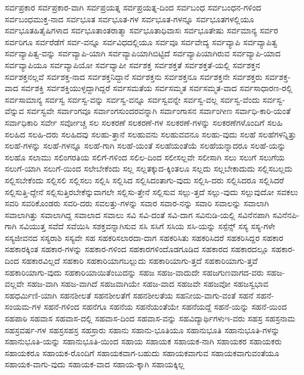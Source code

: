 {ಸರ್ವಪ್ರಕಾರ
ಸರ್ವಪ್ರಕಾರ-ವಾಗಿ
ಸರ್ವಪ್ರಯತ್ನ
ಸರ್ವಪ್ರಯತ್ನ-ದಿಂದ
ಸರ್ವಬಂಧ
ಸರ್ವಬಂಧನ-ಗಳಿಂದ
ಸರ್ವಬಂಧಮುಕ್ತ-ನಾದ
ಸರ್ವಭೂತ
ಸರ್ವಭೂತ-ಗಳ
ಸರ್ವಭೂತ-ಗಳನ್ನೂ
ಸರ್ವಭೂತಗಳಲ್ಲಿಯೂ
ಸರ್ವಭೂತಹಿತೈಷಿಗಳಾದ
ಸರ್ವಭೂತಾಂತರಾತ್ಮಾ
ಸರ್ವಭೂತಾಧಿವಾಸಃ
ಸರ್ವಭೂತೇಷು
ಸರ್ವಮಾನ್ಯ
ಸರ್ವರ
ಸರ್ವರಿಗೂ
ಸರ್ವರೆಡೆಗೆ
ಸರ್ವ-ವನ್ನೂ
ಸರ್ವವಿಧದಲ್ಲಿಯೂ
ಸರ್ವವೂ
ಸರ್ವವೇದ್ಯ
ಸರ್ವವ್ಯಾಪಿ
ಸರ್ವವ್ಯಾಪಿತ್ವ
ಸರ್ವವ್ಯಾಪಿತ್ವ-ವನ್ನು
ಸರ್ವವ್ಯಾಪಿ-ಯಾಗಿ
ಸರ್ವವ್ಯಾಪಿಯಾಗಿಬಿಟ್ಟಿದೆ
ಸರ್ವವ್ಯಾಪಿಯಾಗಿರುವ
ಸರ್ವವ್ಯಾಪಿ-ಯಾದ
ಸರ್ವವ್ಯಾಪಿಯೂ
ಸರ್ವವ್ಯಾಪಿಯೋ
ಸರ್ವವ್ಯಾಪೀ
ಸರ್ವಶಕ್ತ
ಸರ್ವಶಕ್ತತೆ
ಸರ್ವಶಕ್ತತೆ-ಯಲ್ಲಿ
ಸರ್ವಶಕ್ತನ
ಸರ್ವಶಕ್ತನಲ್ಲವೆ
ಸರ್ವಶಕ್ತ-ನಾದ
ಸರ್ವಶಕ್ತನಿದ್ದಾನೆ
ಸರ್ವಶಕ್ತನು
ಸರ್ವಶಕ್ತನೂ
ಸರ್ವಶಕ್ತನೇ
ಸರ್ವಶಕ್ತರು
ಸರ್ವಶಕ್ತ-ವಾದ
ಸರ್ವಶಕ್ತಿ
ಸರ್ವಶಕ್ತಿಯುಳ್ಳದ್ದಾಗಿದ್ದರೆ
ಸರ್ವಸಮತೆಯ
ಸರ್ವಸಮ್ಮತ
ಸರ್ವಸಮ್ಮತ-ವಾದ
ಸರ್ವಸಾಧಾರಣ-ರಲ್ಲಿ
ಸರ್ವಸಾಮಾನ್ಯ
ಸರ್ವಸ್ವ
ಸರ್ವಸ್ವ-ವನ್ನು
ಸರ್ವಸ್ವ-ವನ್ನೂ
ಸರ್ವಸ್ವವನ್ನೇ
ಸರ್ವಸ್ವ-ವಲ್ಲ
ಸರ್ವಸ್ವ-ವೆಂದು
ಸರ್ವಸ್ವ-ವೆನ್ನುವ
ಸರ್ವಸ್ವವೇ
ಸರ್ವಾಂಗವೂ
ಸರ್ವಾಂಗಸುಂದರವನ್ನಾಗಿ
ಸರ್ವಾಂಗಾಸನ
ಸರ್ವಾಂಗೀಣ
ಸರ್ವಾಧಿ-ಕಾರಿ-ಯಂತೆ
ಸರ್ವಾಧಿಕಾರಿ
ಸರ್ವೇ
ಸರ್ವೋಚ್ಚ
ಸಲ
ಸಲಕರಣೆ
ಸಲಕರಣೆ-ಗಳ
ಸಲಕರಣೆ-ಗಳನ್ನು
ಸಲಕರಣೆಗಳೊಂದಿಗೆ
ಸಲಹಿ
ಸಲಹಿದ
ಸಲಹಿ-ದರು
ಸಲಹಿದವು
ಸಲಹು-ತ್ತಾನೆ
ಸಲಹುವನು
ಸಲಹುವವನೂ
ಸಲಹು-ವುದು
ಸಲಹೆ
ಸಲಹೆಗಳನ್ನಿತ್ತು
ಸಲಹೆ-ಗಳನ್ನು
ಸಲಹೆ-ಗಳನ್ನೂ
ಸಲಹೆ-ಗಾಗಿ
ಸಲಹೆ-ಯಂತೆ
ಸಲಹೆಯಂತೆಯೆ
ಸಲಹೆಯನ್ನಾದರೂ
ಸಲಹೆ-ಯನ್ನು
ಸಲಹೊ
ಸಲಾಮು
ಸಲಿಂಗರತಿಯ
ಸಲಿಗೆ-ಗಳಿಂದ
ಸಲಿಲ-ದಿಂದ
ಸಲೀಸಲ್ಲವೇ
ಸಲೀಸಾಗಿ
ಸಲು
ಸಲುಗೆ
ಸಲುಗೆಯ
ಸಲುಗೆ-ಯಾಗಿ
ಸಲುಗೆ-ಯಿಂದ
ಸಲೇಬೇಕೆಂದು
ಸಲ್ಲ
ಸಲ್ಲತಕ್ಕುದ-ಕ್ಕಿಂತಲೂ
ಸಲ್ಲದು
ಸಲ್ಲಬೇಕಾದುದು
ಸಲ್ಲಿಸಬಲ್ಲದು
ಸಲ್ಲಿಸಬೇಕೆಂದು
ಸಲ್ಲಿಸಲಿ
ಸಲ್ಲಿಸಲು
ಸಲ್ಲಿಸಿ
ಸಲ್ಲಿಸಿದ
ಸಲ್ಲಿಸಿದಂತಾಗು-ವುದು
ಸಲ್ಲಿಸಿ-ದರು
ಸಲ್ಲಿಸಿದರೂ
ಸಲ್ಲಿಸಿದರೆ
ಸಲ್ಲಿಸುತ್ತಿ-ದ್ದೇನೆ
ಸಲ್ಲಿಸುತ್ತಿರಬೇಕೆನ್ನುವಾಗಲೇ
ಸಲ್ಲಿಸು-ತ್ತೇನೆ
ಸಲ್ಲಿಸುವ
ಸಲ್ಲು-ತ್ತದೆ
ಸಲ್ಲು-ವುದು
ಸಲ್ಲುವುದೋ
ಸವಕಲು
ಸವರಿ
ಸವರಿಕೊಂಡರು
ಸವರಿ-ದರು
ಸವಲತ್ತು-ಗಳನ್ನು
ಸವಾರ
ಸವಾರ-ನನ್ನು
ಸವಾರಿ
ಸವಾಲನ್ನು
ಸವಾಲಾಗಿ
ಸವಾಲಾಗಿತ್ತು
ಸವಾಲಾಗಿದ್ದ
ಸವಾಲಾದ
ಸವಾಲು
ಸವಿ
ಸವಿ-ದಂತೆ
ಸವಿ-ದಾಗ
ಸವಿನುಡಿ-ಯಲ್ಲಿ
ಸವಿನೆನಪಾಗಿ
ಸವಿನೆನಪಿ-ಗಾಗಿ
ಸವಿಯುತ್ತ
ಸವೆದೆ
ಸವೆಯಿಸಿ
ಸಶಕ್ತವನ್ನಾಗಿಸುವ
ಸಸಿ
ಸಸಿಗೆ
ಸಸಿಯ
ಸಸಿ-ಯನ್ನು
ಸಸ್ಪೆನ್ಸ್
ಸಸ್ಯ
ಸಸ್ಯ-ಗಳೇ
ಸಸ್ಯಜೀವನದ
ಸಸ್ಯರಾಶಿ
ಸಸ್ಯವೇ
ಸಹ
ಸಹಕರಿಸಲಾರದಾ-ದಾಗ
ಸಹಕರಿಸಿತು
ಸಹಕರಿಸಿದರೆ
ಸಹಕರಿಸಿದ್ದರ
ಸಹಕಾರ
ಸಹಕಾರಕ್ಕಿಂತ
ಸಹಕಾರ-ಗಳನ್ನು
ಸಹಕಾರ-ಗಳಿಂದ
ಸಹಕಾರಗಳಿಂದೊಡಗೂಡಿದ
ಸಹಕಾರದ
ಸಹಕಾರದಲ್ಲೂ
ಸಹಕಾರ-ದಿಂದ
ಸಹಕಾರವಿಲ್ಲದೆ
ಸಹಕಾರಿ
ಸಹಕಾರಿಯಾಗಬಲ್ಲುದು
ಸಹಕಾರಿಯಾಗು-ತ್ತದೆ
ಸಹಕಾರಿಯಾಗು-ತ್ತವೆ
ಸಹಕಾರಿಯಾಗು-ವುದು
ಸಹಕಾರಿಯಾಯಿತೆಂಬುದನ್ನು
ಸಹಜ
ಸಹಜ-ವಾದುದೇ
ಸಹಜಗುಣವಾಗದ-ವರು
ಸಹಜ-ವಲ್ಲವೇ
ಸಹಜ-ವಾಗಿ
ಸಹಜ-ವಾಗಿದೆ
ಸಹಜವಾಗಿಯೇ
ಸಹಜ-ವಾದ
ಸಹಜವೇ
ಸಹಜವೋ
ಸಹಜಸ್ವಭಾವ
ಸಹಧರ್ಮಿಣಿ-ಯಾಗಿ
ಸಹನಶೀಲತೆ
ಸಹನಶೀಲತೆಗೆ
ಸಹನಶೀಲತೆಯ
ಸಹನೀಯ-ವಾಗು-ವಂತೆ
ಸಹನೆ
ಸಹನೆ-ಸಂಯಮ-ಗಳ
ಸಹನೆ-ಗಳಿಂದ
ಸಹನೆಗೂ
ಸಹನೆಯ
ಸಹನೆಯಂತೆಯೇ
ಸಹನೆಯದ್ದೆ
ಸಹನೆ-ಯನ್ನು
ಸಹನೆ-ಯಿಂದ
ಸಹಪಾಠಿ
ಸಹವಾಸ
ಸಹವಾಸ-ದಲ್ಲಿ
ಸಹವಾಸ-ದಿಂದ
ಸಹವಾಸ-ವನ್ನು
ಸಹವಿದ್ಯಾರ್ಥಿಗಳುಇ-ವರು
ಸಹಸ್ರ
ಸಹಸ್ರನಾಮ
ಸಹಸ್ರವರ್ಷ-ಗಳ
ಸಹಸ್ರಸಹಸ್ರ
ಸಹಸ್ರಾರು
ಸಹಾನು
ಸಹಾನು-ಭೂತಿಯೂ
ಸಹಾನುಭೂತಿ
ಸಹಾನುಭೂತಿ-ಗಳನ್ನು
ಸಹಾನುಭೂತಿ-ಯನ್ನು
ಸಹಾನುಭೂತಿ-ಯಿಂದ
ಸಹಾಯ
ಸಹಾಯಕ
ಸಹಾಯಕ-ನಾಗಿ
ಸಹಾಯಕರ
ಸಹಾಯಕರು
ಸಹಾಯಕರೂ
ಸಹಾಯಕ-ರೊಂದಿಗೆ
ಸಹಾಯಕವಾಗ-ಬಹುದು
ಸಹಾಯಕವಾಗುವ
ಸಹಾಯಕವಾಗುವಂತೆಯೂ
ಸಹಾಯಕ-ವಾಗು-ವುದು
ಸಹಾಯಕ-ವಾದ
ಸಹಾಯ-ಕ್ಕಾಗಿ
ಸಹಾಯಕ್ಕಿಲ್ಲ
}
